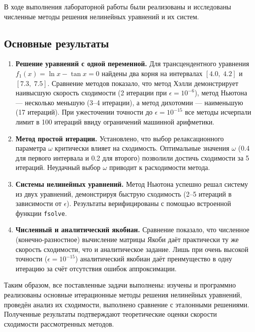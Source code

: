 \documentclass[a4paper]{article}
\begin{document}
В ходе выполнения лабораторной работы были реализованы и исследованы численные методы решения нелинейных уравнений и их систем.

\subsection*{Основные результаты}

\begin{enumerate}
    \item \textbf{Решение уравнений с одной переменной.} Для трансцендентного уравнения $f_1(x) = \ln x - \tan x = 0$ найдены два корня на интервалах $[4.0,\;4.2]$ и $[7.3,\;7.5]$. Сравнение методов показало, что метод Хэлли демонстрирует наивысшую скорость сходимости (2 итерации при $\epsilon=10^{-6}$), метод Ньютона — несколько меньшую (3--4 итерации), а метод дихотомии — наименьшую (17 итераций). При ужесточении точности до $\epsilon=10^{-15}$ все методы исчерпали лимит в 100 итераций ввиду ограничений машинной арифметики.
    \item \textbf{Метод простой итерации.} Установлено, что выбор релаксационного параметра $\omega$ критически влияет на сходимость. Оптимальные значения $\omega$ (0.4 для первого интервала и 0.2 для второго) позволили достичь сходимости за 5 итераций. Неудачный выбор $\omega$ приводит к расходимости метода.
    \item \textbf{Системы нелинейных уравнений.} Метод Ньютона успешно решал систему из двух уравнений, демонстрируя быструю сходимость (2--5 итераций в зависимости от $\epsilon$). Результаты верифицированы с помощью встроенной функции \texttt{fsolve}.
    \item \textbf{Численный и аналитический якобиан.} Сравнение показало, что численное (конечно-разностное) вычисление матрицы Якоби даёт практически ту же скорость сходимости, что и аналитическое задание. Лишь при очень высокой точности ($\epsilon=10^{-15}$) аналитический якобиан даёт преимущество в одну итерацию за счёт отсутствия ошибок аппроксимации.
\end{enumerate}

Таким образом, все поставленные задачи выполнены: изучены и программно реализованы основные итерационные методы решения нелинейных уравнений, проведён анализ их сходимости, выполнено сравнение с эталонными решениями. Полученные результаты подтверждают теоретические оценки скорости сходимости рассмотренных методов.
\end{document}
